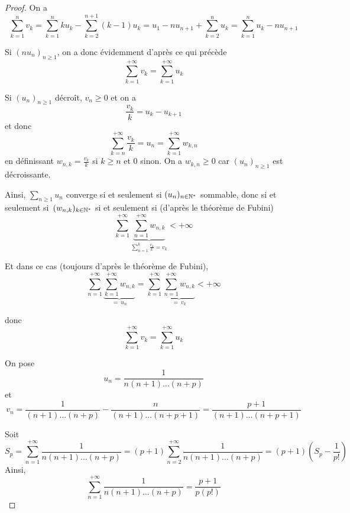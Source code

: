 \documentclass[12pt]{article}
\begin{document}
\begin{proof}
	On a 
	\begin{equation*}\sum_{k=1}^{n}v_{k}=\sum_{k=1}^{n}ku_{k}-\sum_{k=2}^{n+1}(k-1)u_{k}=u_{1}-nu_{n+1}+\sum_{k=2}^{n}u_{k}=\sum_{k=1}^{n}u_{k}-nu_{n+1}\end{equation*}

	Si $(nu_{n})_{n\geqslant1}$, on a donc évidemment d'après ce qui précède
	\begin{equation*}\boxed{\sum_{k=1}^{+\infty}v_{k}=\sum_{k=1}^{+\infty}u_{k}}\end{equation*}

	Si $(u_{n})_{n\geqslant1}$ décroît, $v_{n}\geqslant0$ et on a 
	\begin{equation*}\frac{v_{k}}{k}=u_{k}-u_{k+1}\end{equation*}
	et donc 
	\begin{equation*}\sum_{k=n}^{+\infty}\frac{v_{k}}{k}=u_{n}=\sum_{k=1}^{+\infty}w_{k,n}\end{equation*}
	en définissant $w_{n,k}=\frac{v_{k}}{k}$ si $k\geqslant n$ et 0 sinon. On a $w_{k,n}\geqslant0$ car $(u_{n})_{n\geqslant1}$ est décroissante.

	Ainsi, $\sum_{n\geqslant1}u_{n}$ converge si et seulement si $(u_{n})_{n\in\mathbb{N}^{*}}$ sommable, donc si et seulement si~$(w_{n,k})_{k\in\mathbb{N}^{*}}$ si et seulement si (d'après le théorème de Fubini) 
	\begin{equation*}\sum_{k=1}^{+\infty}\underbrace{\sum_{n=1}^{+\infty}w_{n,k}}_{\sum_{n=1}^{k}\frac{v_{k}}{k}=v_{k}}<+\infty\end{equation*}

	Et dans ce cas (toujours d'après le théorème de Fubini), 
	\begin{equation*}\sum_{n=1}^{+\infty}\underbrace{\sum_{k=1}^{+\infty}w_{n,k}}_{=~u_{n}}=\sum_{k=1}^{+\infty}\underbrace{\sum_{n=1}^{+\infty}w_{n,k}}_{=~v_{k}}<+\infty\end{equation*}

	donc 
	\begin{equation*}\boxed{\sum_{k=1}^{+\infty}v_{k}=\sum_{k=1}^{+\infty}u_{k}}\end{equation*}

	On pose
	\begin{equation*}u_{n}=\frac{1}{n(n+1)\dots(n+p)}\end{equation*}
	et 
	\begin{equation*}v_{n}=\frac{1}{(n+1)\dots(n+p)}-\frac{n}{(n+1)\dots(n+p+1)}=\frac{p+1}{(n+1)\dots(n+p+1)}\end{equation*}

	Soit 
	\begin{equation*}S_{p}=\sum_{n=1}^{+\infty}\frac{1}{n(n+1)\dots(n+p)}=(p+1)\sum_{n=2}^{+\infty}\frac{1}{n(n+1)\dots(n+p)}=(p+1)\left(S_{p}-\frac{1}{p!}\right)\end{equation*}
	Ainsi, 
	\begin{equation*}\boxed{\sum_{n=1}^{+\infty}\frac{1}{n(n+1)\dots(n+p)}}=\frac{p+1}{p(p!)}\end{equation*}
\end{proof}
\end{document}
